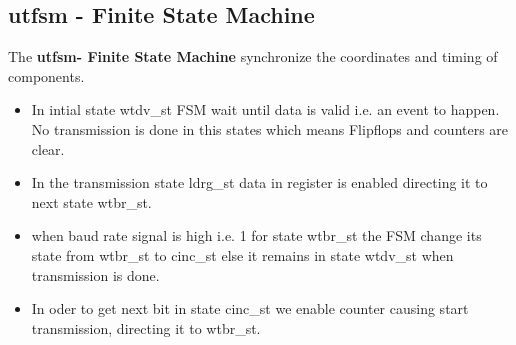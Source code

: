 \documentclass[12pt,a4 paper] {report}
\begin{document}
\subsection*{utfsm - Finite State Machine}
The \textbf{utfsm- Finite State Machine} synchronize the coordinates and timing of components. \\
\begin{itemize}	

\item In intial state wtdv\_st FSM wait until data is valid  i.e. an event to happen. No transmission is done in this states which means Flipflops and counters are clear.\\

\item In the transmission state ldrg\_st data in register is enabled directing it to next state wtbr\_st. \\

\item when baud rate signal is high i.e. 1 for state wtbr\_st the FSM change its state from wtbr\_st to cinc\_st else it remains in state wtdv\_st when transmission is done. \\

\item In oder to get next bit in state cinc\_st we enable counter causing start transmission, directing it to wtbr\_st.\\
\end{itemize}
\end{document}
